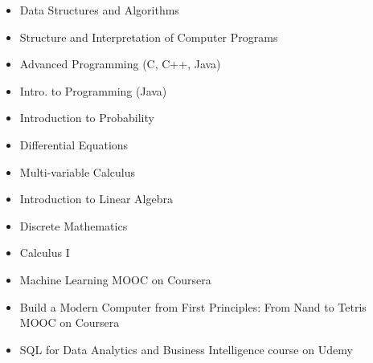 \documentclass[10pt,a4paper,ragged2e]{altacv}
\begin{document}
\begin{itemize}
    \item Data Structures and Algorithms
    \item Structure and Interpretation of Computer Programs
    \item Advanced Programming (C, C++, Java)
    \item Intro. to Programming (Java)
\end{itemize}
\begin{itemize}
    \item Introduction to Probability
    \item Differential Equations
    \item Multi-variable Calculus
    \item Introduction to Linear Algebra
    \item Discrete Mathematics
    \item Calculus I
\end{itemize}
\begin{itemize}
    \item Machine Learning MOOC on Coursera
    \item Build a Modern Computer from First Principles: From Nand to Tetris MOOC on Coursera
    \item SQL for Data Analytics and Business Intelligence course on Udemy
\end{itemize}
\smallskip

\clearpage

\nocite{*}
\end{document}
